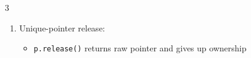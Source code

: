 \documentclass[12pt, a4paper]{article}
\begin{document}
\begin{multicols*}{3}
\begin{enumerate}[\roman*.]
\begin{itemize}[leftmargin=*]
    \end{itemize}
  \item Unique-pointer release:
    \begin{itemize}[leftmargin=*]\vspace{3pt}
      \item \lstinline|p.release()| returns raw pointer and gives up ownership
    \end{itemize}
\end{enumerate}
\end{multicols*}
\end{document}

